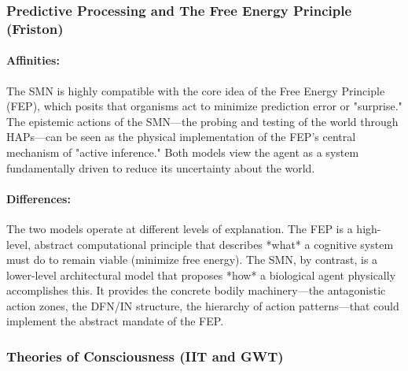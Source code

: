 \subsubsection{Predictive Processing and The Free Energy Principle (Friston)}\label{ssubsec:fep}
\paragraph{Affinities:} The SMN is highly compatible with the core idea of the Free Energy Principle (FEP), which posits that organisms act to minimize prediction error or "surprise." The epistemic actions of the SMN—the probing and testing of the world through HAPs—can be seen as the physical implementation of the FEP's central mechanism of "active inference." Both models view the agent as a system fundamentally driven to reduce its uncertainty about the world.
\paragraph{Differences:} The two models operate at different levels of explanation. The FEP is a high-level, abstract computational principle that describes *what* a cognitive system must do to remain viable (minimize free energy). The SMN, by contrast, is a lower-level architectural model that proposes *how* a biological agent physically accomplishes this. It provides the concrete bodily machinery—the antagonistic action zones, the DFN/IN structure, the hierarchy of action patterns—that could implement the abstract mandate of the FEP.\subsubsection{Theories of Consciousness (IIT and GWT)} \label{ssubsec:consciousness_theories}
